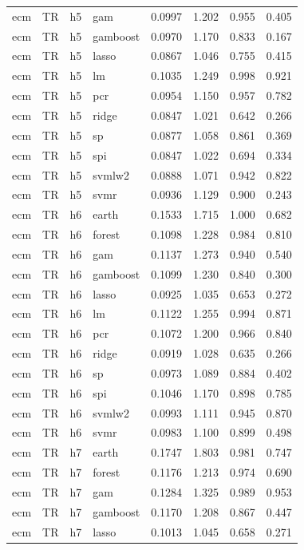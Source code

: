\begin{ThreePartTable}
\begin{longtable}[t]{llclcccc}
ecm & TR & h5 & gam & 0.0997 & 1.202 & 0.955 & 0.405\\
ecm & TR & h5 & gamboost & 0.0970 & 1.170 & 0.833 & 0.167\\
ecm & TR & h5 & lasso & 0.0867 & 1.046 & 0.755 & 0.415\\
ecm & TR & h5 & lm & 0.1035 & 1.249 & 0.998 & 0.921\\
ecm & TR & h5 & pcr & 0.0954 & 1.150 & 0.957 & 0.782\\
ecm & TR & h5 & ridge & 0.0847 & 1.021 & 0.642 & 0.266\\
ecm & TR & h5 & sp & 0.0877 & 1.058 & 0.861 & 0.369\\
ecm & TR & h5 & spi & 0.0847 & 1.022 & 0.694 & 0.334\\
ecm & TR & h5 & svmlw2 & 0.0888 & 1.071 & 0.942 & 0.822\\
ecm & TR & h5 & svmr & 0.0936 & 1.129 & 0.900 & 0.243\\
\addlinespace
ecm & TR & h6 & earth & 0.1533 & 1.715 & 1.000 & 0.682\\
ecm & TR & h6 & forest & 0.1098 & 1.228 & 0.984 & 0.810\\
ecm & TR & h6 & gam & 0.1137 & 1.273 & 0.940 & 0.540\\
ecm & TR & h6 & gamboost & 0.1099 & 1.230 & 0.840 & 0.300\\
ecm & TR & h6 & lasso & 0.0925 & 1.035 & 0.653 & 0.272\\
ecm & TR & h6 & lm & 0.1122 & 1.255 & 0.994 & 0.871\\
ecm & TR & h6 & pcr & 0.1072 & 1.200 & 0.966 & 0.840\\
ecm & TR & h6 & ridge & 0.0919 & 1.028 & 0.635 & 0.266\\
ecm & TR & h6 & sp & 0.0973 & 1.089 & 0.884 & 0.402\\
ecm & TR & h6 & spi & 0.1046 & 1.170 & 0.898 & 0.785\\
ecm & TR & h6 & svmlw2 & 0.0993 & 1.111 & 0.945 & 0.870\\
ecm & TR & h6 & svmr & 0.0983 & 1.100 & 0.899 & 0.498\\
\addlinespace
ecm & TR & h7 & earth & 0.1747 & 1.803 & 0.981 & 0.747\\
ecm & TR & h7 & forest & 0.1176 & 1.213 & 0.974 & 0.690\\
ecm & TR & h7 & gam & 0.1284 & 1.325 & 0.989 & 0.953\\
ecm & TR & h7 & gamboost & 0.1170 & 1.208 & 0.867 & 0.447\\
ecm & TR & h7 & lasso & 0.1013 & 1.045 & 0.658 & 0.271\\

\end{longtable}
\end{ThreePartTable}
